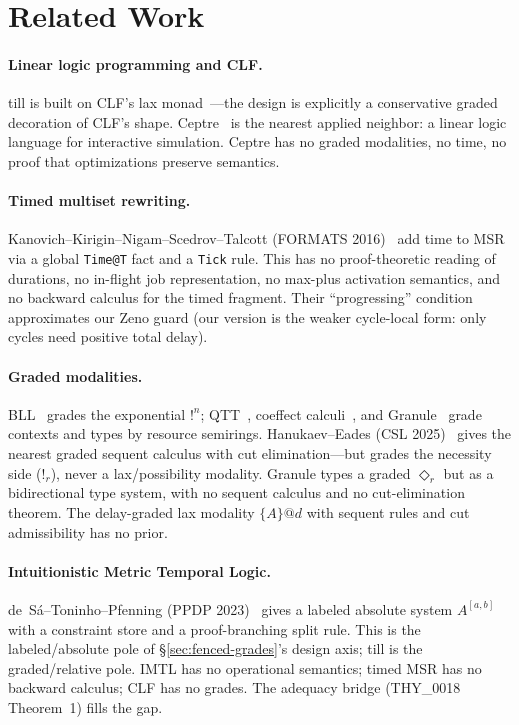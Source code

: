 \documentclass[11pt]{article}
\makeatletter
\newcommand{\laxm}[2]{\{#1\}@{#2}}
\theoremstyle{remark}
\makeatother
\begin{document}
\section{Related Work}
\label{sec:related-work}

\paragraph{Linear logic programming and CLF.} till is built on CLF's lax
monad~\cite{WatkinsCervesatoPfenningWalker02}---the design is explicitly a
conservative graded decoration of CLF's shape.
Ceptre~\cite{Martens15} is the nearest applied neighbor: a linear logic language
for interactive simulation.  Ceptre has no graded modalities, no time, no proof
that optimizations preserve semantics.

\paragraph{Timed multiset rewriting.}
Kanovich--Kirigin--Nigam--Scedrov--Talcott (FORMATS
2016)~\cite{KanovichKiriginNigamScedrovTalcott16} add time to MSR via a global
\texttt{Time@T} fact and a \texttt{Tick} rule.  This has no proof-theoretic reading
of durations, no in-flight job representation, no max-plus activation semantics,
and no backward calculus for the timed fragment.  Their ``progressing'' condition
approximates our Zeno guard (our version is the weaker cycle-local form: only
cycles need positive total delay).

\paragraph{Graded modalities.}
BLL~\cite{GirardScedrovScott92} grades the exponential $!^n$;
QTT~\cite{Atkey18}, coeffect calculi~\cite{GaboardiKatsumataOrchardBreuvartUustalu16},
and Granule~\cite{OrchardLiepeltEades19} grade contexts and types by resource
semirings.  Hanukaev--Eades (CSL 2025)~\cite{HanukaevEades25} gives the nearest
graded sequent calculus with cut elimination---but grades the necessity side
($!_r$), never a lax/possibility modality.  Granule types a graded $\Diamond_r$
but as a bidirectional type system, with no sequent calculus and no
cut-elimination theorem.  The delay-graded lax modality $\laxm{A}{d}$ with
sequent rules and cut admissibility has no prior.

\paragraph{Intuitionistic Metric Temporal Logic.}
de~S{\'a}--Toninho--Pfenning (PPDP 2023)~\cite{deSaToninhoPfenning23} gives a
labeled absolute system $A^{[a,b]}$ with a constraint store and a
proof-branching split rule.  This is the labeled/absolute pole of
\S\ref{sec:fenced-grades}'s design axis; till is the graded/relative pole.  IMTL
has no operational semantics; timed MSR has no backward calculus; CLF has no
grades.  The adequacy bridge (THY\_0018 Theorem~1) fills the gap.
\end{document}
